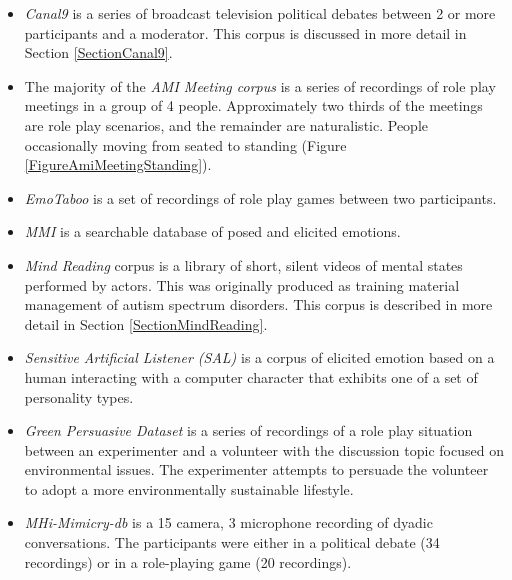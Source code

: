 \begin{itemize}
\item \textit{Canal9} is a series of broadcast television political debates between 2 or more participants and a moderator. This corpus is discussed in more detail in Section \ref{SectionCanal9}.
\item The majority of the \textit{AMI Meeting corpus} is a series of recordings of role play meetings in a group of 4 people. Approximately two thirds of the meetings are role play scenarios, and the remainder are naturalistic. People occasionally moving from seated to standing (Figure \ref{FigureAmiMeetingStanding}).
\item \textit{EmoTaboo} is a set of recordings of role play games between two participants.
\item \textit{MMI} is a searchable database of posed and elicited emotions.
\item \textit{Mind Reading} corpus is a library of short, silent videos of mental states performed by actors. This was originally produced as training material management of autism spectrum disorders. This corpus is described in more detail in Section \ref{SectionMindReading}.
\item \textit{Sensitive Artificial Listener (SAL)} is a corpus of elicited emotion based on a human interacting with a computer character that exhibits one of a set of personality types.
\item \textit{Green Persuasive Dataset} is a series of recordings of a role play situation between an experimenter and a volunteer with the discussion topic focused on environmental issues. The experimenter attempts to persuade the volunteer to adopt a more environmentally sustainable lifestyle.
\item \textit{MHi-Mimicry-db\cite{Sun2011}} is a 15 camera, 3 microphone recording of dyadic conversations. The participants were either in a political debate (34 recordings) or in a role-playing game (20 recordings).
\end{itemize}


